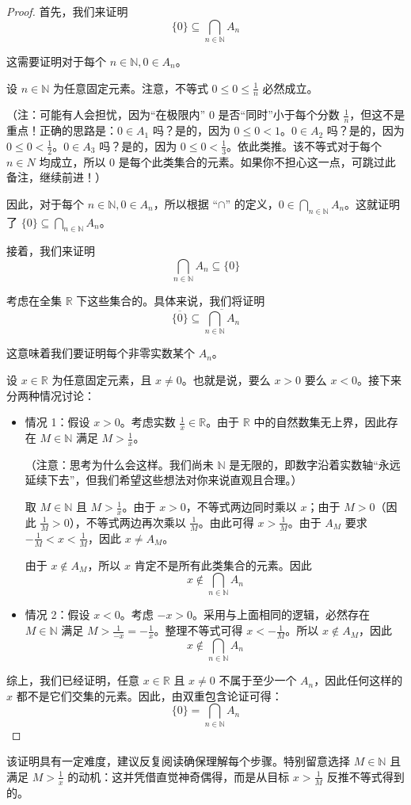 \begin{proof}
    首先，我们来证明
    \[\{0\} \subseteq \bigcap_{n \in \mathbb{N}}A_n\]

    这需要证明对于每个 $n \in \mathbb{N}, 0 \in A_n$。

    设 $n \in \mathbb{N}$ 为任意固定元素。注意，不等式 $0 \le 0 \le \frac{1}{n}$ 必然成立。

    （注：可能有人会担忧，因为``在极限内'' $0$ 是否``同时''小于每个分数 $\frac{1}{n}$，但这不是重点！正确的思路是：$0 \in A_1$ 吗？是的，因为 $0 \le 0 < 1$。$0 \in A_2$ 吗？是的，因为 $0 \le 0 < \frac{1}{2}$。$0 \in A_3$ 吗？是的，因为 $0 \le 0 < \frac{1}{3}$。依此类推。该不等式对于每个 $n \in N$ 均成立，所以 $0$ 是每个此类集合的元素。如果你不担心这一点，可跳过此备注，继续前进！）

    因此，对于每个 $n \in \mathbb{N}, 0 \in A_n$，所以根据 ``$\cap$'' 的定义，$\displaystyle{0 \in \bigcap_{n \in \mathbb{N}} A_n}$。这就证明了 $\displaystyle{\{0\} \subseteq \bigcap_{n \in \mathbb{N}} A_n}$。

    接着，我们来证明
    \[\bigcap_{n \in \mathbb{N}}A_n \subseteq \{0\}\]

    考虑在全集 $\mathbb{R}$ 下这些集合的。具体来说，我们将证明
    \[\overline{\{0\}} \subseteq \overline{\bigcap_{n \in \mathbb{N}}A_n}\]

    这意味着我们要证明每个非零实数某个 $A_n$。

    设 $x \in \mathbb{R}$ 为任意固定元素，且 $x \ne 0$。也就是说，要么 $x > 0$ 要么 $x < 0$。接下来分两种情况讨论：

    \begin{itemize}
        \item 情况 1：假设 $x > 0$。考虑实数 $\frac{1}{x} \in \mathbb{R}$。由于 $\mathbb{R}$ 中的自然数集无上界，因此存在 $M \in \mathbb{N}$ 满足 $M > \frac{1}{x}$。
        
        （注意：思考为什么会这样。我们尚未 $\mathbb{N}$ 是无限的，即数字沿着实数轴``永远延续下去''，但我们希望这些想法对你来说直观且合理。）

        取 $M \in \mathbb{N}$ 且 $M > \frac{1}{x}$。由于 $x > 0$，不等式两边同时乘以 $x$；由于 $M > 0$（因此 $\frac{1}{M} > 0$），不等式两边再次乘以 $\frac{1}{M}$。由此可得 $x > \frac{1}{M}$。由于 $A_M$ 要求 $-\frac{1}{M} < x < \frac{1}{M}$，因此 $x \ne A_M$。

        由于 $x \notin A_M$，所以 $x$ 肯定不是所有此类集合的元素。因此
        \[x \notin \bigcap_{n \in \mathbb{N}} A_n\]

        \item 情况 2：假设 $x < 0$。考虑 $-x > 0$。采用与上面相同的逻辑，必然存在 $M \in \mathbb{N}$ 满足 $M > \frac{1}{-x} = -\frac{1}{x}$。整理不等式可得 $x < -\frac{1}{M}$。所以 $x \notin A_M$，因此 
        \[x \notin \bigcap_{n \in \mathbb{N}} A_n\]
    \end{itemize}

    综上，我们已经证明，任意 $x \in \mathbb{R}$ 且 $x \ne 0$ 不属于至少一个 $A_n$，因此任何这样的 $x$ 都不是它们交集的元素。因此，由双重包含论证可得：
    \[\{0\} = \bigcap_{n \in \mathbb{N}} A_n\]
\end{proof}

该证明具有一定难度，建议反复阅读确保理解每个步骤。特别留意选择 $M \in \mathbb{N}$ 且满足 $M > \frac{1}{x}$ 的动机：这并凭借直觉神奇偶得，而是从目标 $x > \frac{1}{M}$ 反推不等式得到的。
